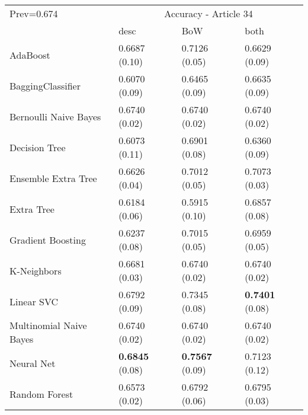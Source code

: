 \begin{tabular}{|l|l|l|l| }
\hline
Prev=0.674 &  \multicolumn{3}{c|}{Accuracy - Article 34} \\
\cline{2-4} & desc & BoW & both \\ \hline
AdaBoost                & 0.6687 (0.10) & 0.7126 (0.05) & 0.6629 (0.09)\\
BaggingClassifier       & 0.6070 (0.09) & 0.6465 (0.09) & 0.6635 (0.09)\\
Bernoulli Naive Bayes   & 0.6740 (0.02) & 0.6740 (0.02) & 0.6740 (0.02)\\
Decision Tree           & 0.6073 (0.11) & 0.6901 (0.08) & 0.6360 (0.09)\\
Ensemble Extra Tree     & 0.6626 (0.04) & 0.7012 (0.05) & 0.7073 (0.03)\\
Extra Tree              & 0.6184 (0.06) & 0.5915 (0.10) & 0.6857 (0.08)\\
Gradient Boosting       & 0.6237 (0.08) & 0.7015 (0.05) & 0.6959 (0.05)\\
K-Neighbors             & 0.6681 (0.03) & 0.6740 (0.02) & 0.6740 (0.02)\\
Linear SVC              & 0.6792 (0.09) & 0.7345 (0.08) & {\bf 0.7401} (0.08)\\
Multinomial Naive Bayes & 0.6740 (0.02) & 0.6740 (0.02) & 0.6740 (0.02)\\
Neural Net              & {\bf 0.6845} (0.08) & {\bf 0.7567} (0.09) & 0.7123 (0.12)\\
Random Forest           & 0.6573 (0.02) & 0.6792 (0.06) & 0.6795 (0.03)\\
\hline
\end{tabular}